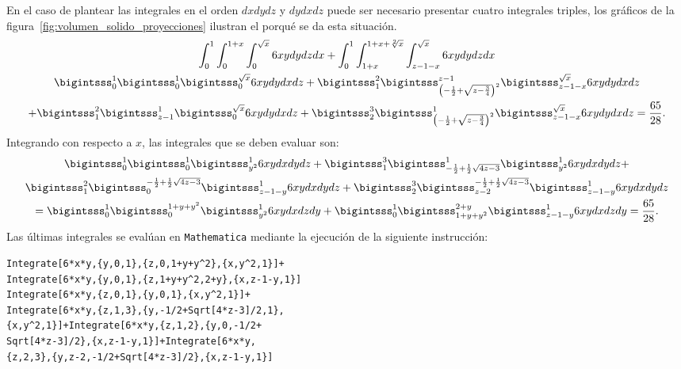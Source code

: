 En el caso de plantear las integrales en el orden $dxdydz$ y $dydxdz$ puede ser necesario presentar cuatro integrales triples, los gráficos de la figura~\ref{fig:volumen_solido_proyecciones} ilustran el porqué se da esta situación.
\begin{multline*} \int_{0}^{1}\int_{0}^{1+x}\int_{0}^{\sqrt{x}}6xydydzdx+\int_{0}^{1}\int_{1+x}^{1+x+\sqrt[2]{x}}\int_{z-1-x}^{\sqrt{x}}6xydydzdx \\
\bigintsss_{0}^{1}\bigintsss_{0}^{1}\bigintsss_{0}^{\sqrt{x}}6xydydxdz
+\bigintsss_{1}^2\bigintsss_{\left( -\frac{1}{2}+\sqrt{z-\frac{3}{4}}\right) ^2}^{z-1}\bigintsss_{z-1-x}^{\sqrt{x}}6xydydxdz\\
+\bigintsss_{1}^2\bigintsss_{z-1}^{1}\bigintsss_{0}^{\sqrt{x}}6xydydxdz +\bigintsss_{2}^{3}\bigintsss_{\left( -\frac{1}{2}+\sqrt{z-\frac{3}{4}}\right)
^2}^{1}\bigintsss_{z-1-x}^{\sqrt{x}}6xydydxdz= \frac{65}{28}.
\end{multline*}
Integrando con respecto a $x$, las integrales que se deben evaluar son:
\begin{multline*}
\bigintsss_{0}^{1}\bigintsss_{0}^{1}\bigintsss_{y^2}^{1}6xydxdydz+\bigintsss_{1}^{3}\bigintsss_{-\frac{1}{2}+\frac{1}{2}\sqrt{4z-3}}^{1}\bigintsss_{y^2}^{1}6xydxdydz+ \\ \bigintsss_{1}^{2}\bigintsss_{0}^{-\frac{1}{2}+\frac{1}{2}\sqrt{4z-3}}\bigintsss_{z-1-y}^{1}6xydxdydz+\bigintsss_{2}^{3}\bigintsss_{z-2}^{-\frac{1}{2}+\frac{1}{2}\sqrt{4z-3}}\bigintsss_{z-1-y}^{1}6xydxdydz \\
=\bigintsss_{0}^{1}\bigintsss_{0}^{1+y+y^2}\bigintsss_{y^2}^{1}6xydxdzdy+\bigintsss_{0}^{1}\bigintsss_{1+y+y^2}^{2+y}\bigintsss_{z-1-y}^{1}6xydxdzdy= \frac{65}{28}.
\end{multline*}
Las últimas integrales se evalúan en \verb"Mathematica" mediante la ejecución de la siguiente instrucción:

\begin{tcolorbox}[title=\bf Instrucción en \verb"Mathematica"]\begin{Verbatim}[formatcom=\letraverbatim]
Integrate[6*x*y,{y,0,1},{z,0,1+y+y^2},{x,y^2,1}]+
Integrate[6*x*y,{y,0,1},{z,1+y+y^2,2+y},{x,z-1-y,1}]
Integrate[6*x*y,{z,0,1},{y,0,1},{x,y^2,1}]+
Integrate[6*x*y,{z,1,3},{y,-1/2+Sqrt[4*z-3]/2,1},
{x,y^2,1}]+Integrate[6*x*y,{z,1,2},{y,0,-1/2+
Sqrt[4*z-3]/2},{x,z-1-y,1}]+Integrate[6*x*y,
{z,2,3},{y,z-2,-1/2+Sqrt[4*z-3]/2},{x,z-1-y,1}]
\end{Verbatim}
\end{tcolorbox}

